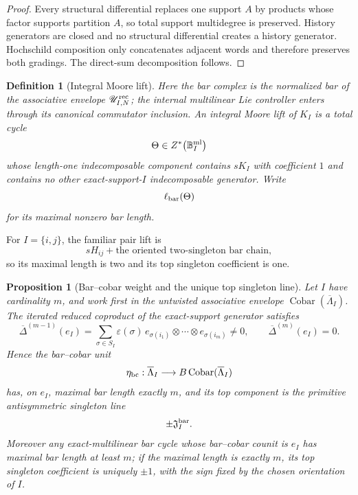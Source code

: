\documentclass[11pt]{article}
\newtheorem{proposition}[theorem]{Proposition}
\newtheorem{definition}[theorem]{Definition}
\theoremstyle{remark}
\newcommand{\Cobar}{\operatorname{Cobar}}
\begin{document}
\begin{proof}
Every structural differential replaces one support \(A\) by products whose
factor supports partition \(A\), so total support multidegree is preserved.
History generators are closed and no structural differential creates a
history generator.  Hochschild composition only concatenates adjacent words
and therefore preserves both gradings.  The direct-sum decomposition follows.
\end{proof}

\begin{definition}[Integral Moore lift]
\label{P2M-def:v28-integral-moore-lift}
Here the bar complex is the normalized bar of the associative envelope
$\mathscr U^{\rm rec}_{I,N}$; the internal multilinear Lie controller enters
through its canonical commutator inclusion.  An \emph{integral Moore lift of
\(K_I\)} is a total cycle
\[
 \Theta\in Z^*\!\left(\mathbb B_I^{\rm ml}\right)
\]
whose length-one indecomposable component contains \(sK_I\) with coefficient
\(1\) and contains no other exact-support-\(I\) indecomposable generator.  Write
\[
 \ell_{\rm bar}(\Theta)
\]
for its maximal nonzero bar length.
\end{definition}

For \(I=\{i,j\}\), the familiar pair lift is
\[
 sH_{ij}
 +\text{the oriented two-singleton bar chain},
\]
so its maximal length is two and its top singleton coefficient is one.


\begin{proposition}[Bar--cobar weight and the unique top singleton line]
\label{P2M-prop:v31-barcobar-weight}
Let \(I\) have cardinality \(m\), and work first in the untwisted associative
envelope \(\Cobar(\overline\Lambda_I)\).  The iterated reduced coproduct of the
exact-support generator satisfies
\begin{equation}\label{P2M-eq:v31-iterated-reduced-coproduct}
 \overline\Delta^{(m-1)}(e_I)
 =
 \sum_{\sigma\in S_I}
 \varepsilon(\sigma)\,
 e_{\sigma(i_1)}\otimes\cdots\otimes e_{\sigma(i_m)}
 \ne0,
 \qquad
 \overline\Delta^{(m)}(e_I)=0.
\end{equation}
Hence the bar--cobar unit
\[
 \eta_{\rm bc}:
 \overline\Lambda_I
 \longrightarrow
 B\Cobar(\overline\Lambda_I)
\]
has, on \(e_I\), maximal bar length exactly \(m\), and its top component is
the primitive antisymmetric singleton line
\[
 \pm\mathfrak J_I^{\rm bar}.
\]
Moreover any exact-multilinear bar cycle whose bar--cobar counit is
\(e_I\) has maximal bar length at least \(m\); if the maximal length is
exactly \(m\), its top singleton coefficient is uniquely \(\pm1\), with the
sign fixed by the chosen orientation of \(I\).
\end{proposition}
\end{document}
